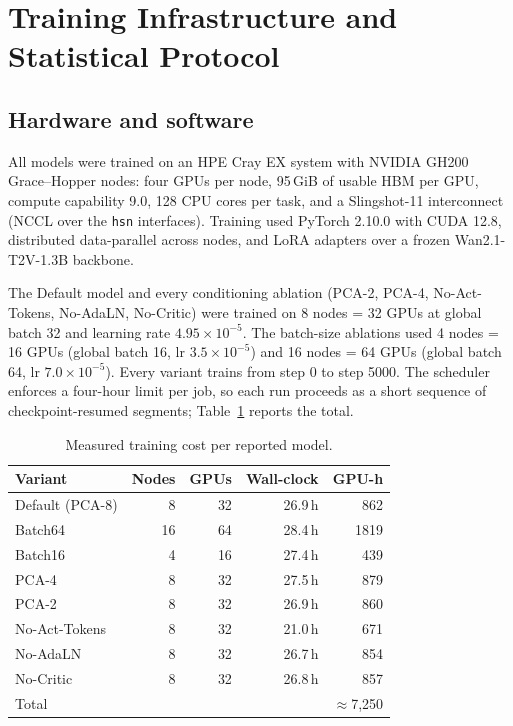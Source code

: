 
\section{Training Infrastructure and Statistical Protocol}
\label{app:compute}

\subsection{Hardware and software}

All models were trained on an HPE Cray EX system with NVIDIA GH200
Grace--Hopper nodes: four GPUs per node, 95\,GiB of usable HBM per GPU, compute
capability 9.0, 128 CPU cores per task, and a Slingshot-11 interconnect
(NCCL over the \texttt{hsn} interfaces). Training used PyTorch 2.10.0 with CUDA
12.8, distributed data-parallel across nodes, and LoRA adapters over a frozen
Wan2.1-T2V-1.3B backbone.

The Default model and every conditioning ablation (PCA-2, PCA-4, No-Act-Tokens,
No-AdaLN, No-Critic) were trained on 8 nodes = 32 GPUs at global batch 32 and
learning rate $4.95\times10^{-5}$. The batch-size ablations used 4 nodes = 16
GPUs (global batch 16, lr $3.5\times10^{-5}$) and 16 nodes = 64 GPUs (global
batch 64, lr $7.0\times10^{-5}$). Every variant trains from step 0 to step 5000.
The scheduler enforces a four-hour limit per job, so each run proceeds as a
short sequence of checkpoint-resumed segments; Table~\ref{tab:compute} reports
the total.

\begin{table}[t]
\centering
\small
\begin{tabular}{lrrrr}
\toprule
Variant & Nodes & GPUs & Wall-clock & GPU-h \\
\midrule
Default (PCA-8)   & 8  & 32 & 26.9\,h & 862 \\
Batch64           & 16 & 64 & 28.4\,h & 1819 \\
Batch16           & 4  & 16 & 27.4\,h & 439 \\
PCA-4             & 8  & 32 & 27.5\,h & 879 \\
PCA-2             & 8  & 32 & 26.9\,h & 860 \\
No-Act-Tokens     & 8  & 32 & 21.0\,h & 671 \\
No-AdaLN          & 8  & 32 & 26.7\,h & 854 \\
No-Critic         & 8  & 32 & 26.8\,h & 857 \\
\midrule
\multicolumn{4}{l}{Total} & $\approx$7{,}250 \\
\bottomrule
\end{tabular}
\caption{Measured training cost per reported model.}
\label{tab:compute}
\end{table}

